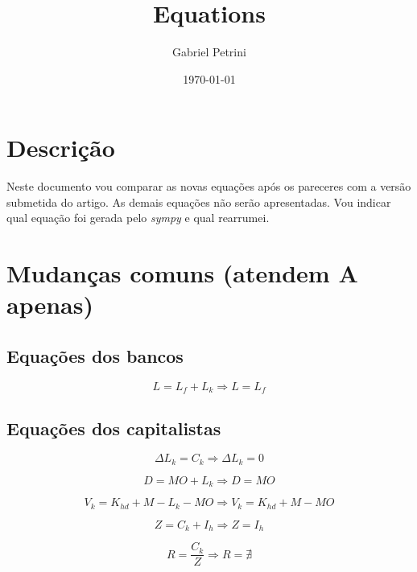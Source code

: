 \documentclass[11pt]{article}
\author{Gabriel Petrini}
\date{\today}
\title{Equations}
\begin{document}
\maketitle

\section*{Descrição}
\label{sec:orgf7496c1}

Neste documento vou comparar as novas equações após os pareceres com a versão submetida do artigo.
As demais equações não serão apresentadas.
Vou indicar qual equação foi gerada pelo \emph{sympy} e qual rearrumei.

\section*{Mudanças comuns (atendem A apenas)}
\label{sec:org52c19fc}

\subsection*{Equações dos bancos}
\label{sec:org8e6509c}

\begin{latex}
\begin{equation}
L = L_{f} + L_{k} \Rightarrow L = L_{f}
\end{equation}
\end{latex}

\subsection*{Equações dos capitalistas}
\label{sec:org272ee5c}

\begin{latex}
\begin{equation}
\Delta L_{k} = C_{k} \Rightarrow \Delta L_{k} = 0
\end{equation}
\end{latex}
\begin{latex}
\begin{equation}
D = MO + L_{k} \Rightarrow D = MO
\end{equation}
\end{latex}
\begin{latex}
\begin{equation}
V_{k} = K_{hd} + M - L_{k} - MO \Rightarrow V_{k} = K_{hd} + M - MO
\end{equation}
\end{latex}
\begin{latex}
\begin{equation}
Z = C_{k} + I_{h} \Rightarrow Z = I_{h}
\end{equation}
\end{latex}
\begin{latex}
\begin{equation}
R = \frac{C_{k}}{Z} \Rightarrow R = \nexists
\end{equation}
\end{latex}
\end{document}
